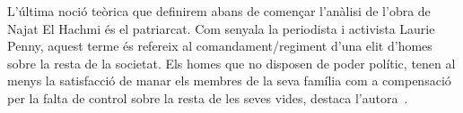 \begin{comment}
  1) autoidentificació
  buscant la seva identitat
  * religió
  * literatura

  2) les atribucions
  * com han de ser les nenes/les dones?
    ** alleine fuer die ganze care arbeit zustaendig, wird als natuerliche neigung inszeniert
  * les dones i les "altres" són culpables per tot (vgl Laurie Penny)
    --> keine Solidaritaet zwischen den Frauen (zb la mare i les amants) moeglich, obwohl sie alle Opfer sind; sie werden gegen einander ausgespielt
  * frauen werden auf ihr aeusseres reduziert
  * die frauen wuerden nie genuegen;
\end{comment}

L'última noció teòrica que definirem abans de començar l'anàlisi de l'obra de Najat El Hachmi és el patriarcat.
Com senyala la periodista i activista Laurie Penny, aquest terme és refereix al comandament/regiment d'una elit d'homes sobre la resta de la societat.
Els homes que no disposen de poder polític, tenen al menys la satisfacció de manar els membres de la seva família com a compensació per la falta de control sobre la resta de les seves vides, destaca l'autora~\autocite[69-70]{Penny2014}.

\begin{comment}
\subsubsection{Quotes}
"Aquesta és la història de Mimoun, fill de Driouch, fill d'Allal, fill de Mohamed, fill de Mohand, fill de Bouziane, i que nosaltres anomenarem, simplement, Mimoun." (p.7)
-- die Wichtigkeit, das Mystische, sein Stammbaum, seine Geschichte wird ihm entzogen?

"És la seva història i la història de l'últim dels grans patriarques que formen la llarga cadena dels avantpassants de Driouch. Cadascun d'ells havia viscut, actuat i influït en la vida de tots els que els envoltaven amb la fermessa de les gran figures bíbliques." (p.7)

"Aquesta és l'única veritat que us volem explicar, la d'un pare que ha d'afrontar la frustració de no veure acomplert el seu destí, la d'una filla que, sense haver-s'ho prposat, va canviar la història dels Driouch per sempre." (p.7)
-- el destí té un paper central; es menciona bastant sovint

"El pare deia mira, el teu germà és molt menys ploraner que tu [...] I què faràs quan t'hi barallis, qui serà el vencedor, tu o ell, que és més petit? Si vols que t'acabi respectant i et digui Azizi\footnote{Apel.latiu que els germans petits donen als més grans com a senyal de respecte}, ja pots imposar-t'hi." (p.21)
grandioese Erziehungsmethoden, die fuer geschwisterliche Liebe sorgen und bescheuerte Geschlechterstereotypen auf keinen Fall fortsetzen.
iwann bringt er mit 3 seinen kleinen Bruder um. So viel zum Erfolg davon

altra violació:
"Però el Manel tenia aquell mena d'instint de caçador que han de tenir per força els que estan destinats  a ser gran patriarques i no entenia que era no." (.91)
-- no means no
\end{comment}

